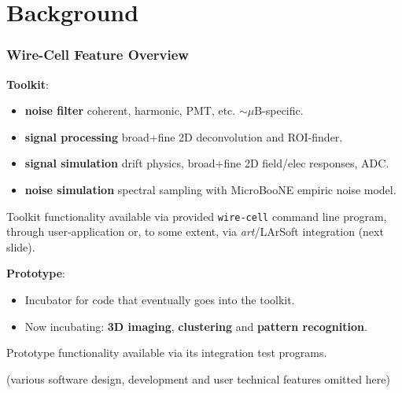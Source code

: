 \documentclass[xcolor=dvipsnames]{beamer}
\begin{document}



\section{Background}

\begin{frame}
  \frametitle{Wire-Cell Feature Overview}
  \textbf{Toolkit}:
  \begin{itemize}\footnotesize
  \item \textbf{noise filter} coherent, harmonic, PMT, etc.  $\sim\mu$B-specific.
  \item \textbf{signal processing} broad+fine 2D deconvolution and ROI-finder.
  \item \textbf{signal simulation} drift physics, broad+fine 2D field/elec responses, ADC.
  \item \textbf{noise simulation} spectral sampling with MicroBooNE empiric noise model.
  \end{itemize}
  \scriptsize Toolkit functionality available via provided
  \texttt{wire-cell} command line program, through user-application or, to
  some extent, via \textit{art}/LArSoft integration (next slide).

  \vfill

  \normalsize
  \textbf{Prototype}:
  \begin{itemize}\footnotesize
  \item Incubator for code that eventually goes into the toolkit.
  \item Now incubating: \textbf{3D imaging}, \textbf{clustering} and \textbf{pattern recognition}.
  \end{itemize}
  \scriptsize Prototype functionality available via its integration test programs.

  \vfill

  \begin{center}\tiny
    (various software design, development and user technical features omitted here)
  \end{center}

\end{frame}
\end{document}
